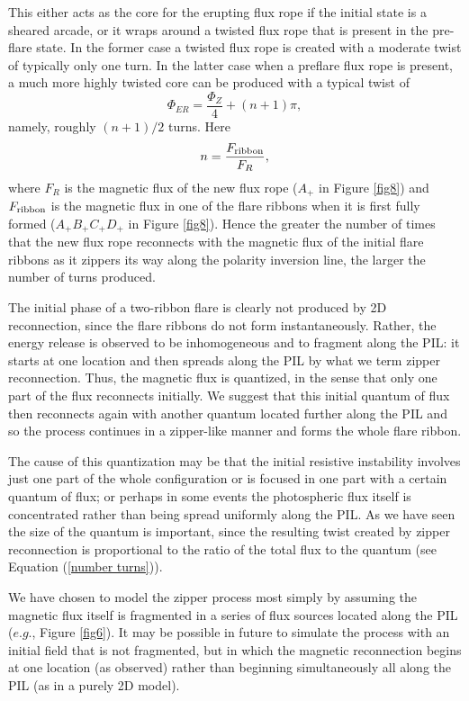 \documentclass[10pt,namedreferneces]{SolarPhysics}
\begin{document}
\begin{article}
This  either acts as the core for the erupting flux rope if the initial state is a sheared arcade,  or it  wraps around a  twisted flux rope that is present in the pre-flare state. 
In the former case a twisted flux rope is created with a moderate twist of typically only one turn.
In the latter case when a preflare flux rope is present,
 a much more highly twisted core can be produced with a typical twist of 
  \begin{equation}
\Phi_{ER}=\frac{\Phi_{Z}}{4}+(n+1)\pi,
\end{equation}
namely, roughly $(n+1)/2$ turns. 
Here
\begin{equation}
n=\frac{F_{\rm ribbon}}{F_R}, 
\end{equation}
where $F_R$ is the magnetic flux of the new flux rope  ($A_+$ in Figure \ref{fig8}) and $F_{\rm ribbon}$ is the magnetic flux in one of the flare ribbons when it is first fully formed  ($A_+B_+C_+D_+$ in Figure \ref{fig8}).
Hence the greater the number of times that the new flux rope reconnects with the  magnetic flux of the initial flare ribbons as it zippers its way along the polarity inversion line, the larger the number of turns produced.

The initial phase of a two-ribbon flare is clearly not produced by 2D reconnection, since the flare ribbons do not form instantaneously. Rather, the energy release is observed to be inhomogeneous and to fragment along the PIL: it starts at one location and then spreads along the PIL by what we term zipper reconnection. Thus, the magnetic flux is quantized, in the sense that only one part of the flux reconnects initially. We suggest that this initial quantum of flux then reconnects again with another quantum located further along the PIL and so the process continues in a zipper-like manner and forms the whole flare ribbon.  

The cause of this quantization may be that the initial resistive instability involves just one part of the whole configuration or is focused in one part with a certain quantum of flux; or perhaps in some events the photospheric flux itself is concentrated rather than being spread uniformly along the PIL. As we have seen the size of the quantum is important, since the resulting twist created by zipper reconnection is proportional to the ratio of the total flux to the quantum (see Equation (\ref{number turns})).

We have chosen to model the zipper process most simply by assuming the magnetic flux itself is fragmented in a series of flux sources located along the PIL ($e.g.$, Figure \ref{fig6}). It may be possible in future to simulate the process with an initial field that is not fragmented, but in which the magnetic reconnection begins at one location (as observed) rather than beginning simultaneously all along the PIL (as in a purely 2D model).


\end{article}
\end{document}
